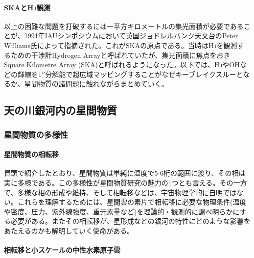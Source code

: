 \paragraph{SKAとH\,\textsc{i}観測}

以上の困難な問題を打破するには一平方キロメートルの集光面積が必要であることが、1991年IAUシンポジウムにおいて英国ジョドレルバンク天文台のPeter Williams氏によって指摘された。これがSKAの原点である。当時はH\,\textsc{i}を観測するための干渉計Hydrogen Arrayと呼ばれていたが、集光面積に焦点をおきSquare Kilometre Array (SKA)と呼ばれるようになった。以下では、H\,\textsc{i}やOHなどの輝線を$1''$分解能で超広域マッピングすることがなぜキーブレイクスルーとなるか、星間物質の諸問題に触れながらまとめていく。


\subsection{天の川銀河内の星間物質}
\label{c08.s1.ss2}

\subsubsection{星間物質の多様性}
\label{c08.s1.ss2.sss1}

\paragraph{星間物質の相転移}

冒頭で紹介したとおり、星間物質は単純に温度で5-6桁の範囲に渡り、その相は実に多様である。この多様性が星間物質研究の魅力の1つとも言える。その一方で、多様な相の形成や維持、そして相転移などは、宇宙物理学的に自明ではない。これらを理解するためには、星間雲の素片で相転移に必要な物理条件(温度や密度、圧力、紫外線強度、重元素量など)を理論的・観測的に調べ明らかにする必要がある。またその相転移が、星形成などの銀河の特性にどのような影響をあたえるのかも解明していく使命がある。

\paragraph{相転移と小スケールの中性水素原子雲}

